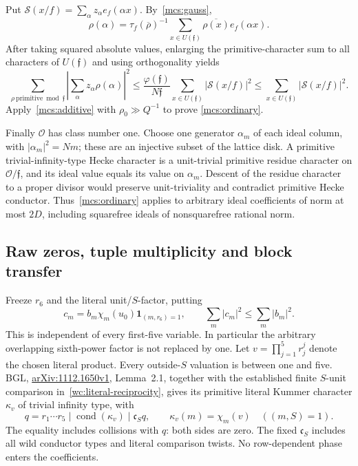 \documentclass[11pt,oneside,openany]{book}
\theoremstyle{definition}\newtheorem{definition}[theorem]{Definition}
\theoremstyle{remark}\newtheorem{remark}[theorem]{Remark}
\begin{document}
Put $\mathcal S(x/f)=\sum_\alpha z_\alpha e_f(\alpha x)$.
By~\eqref{mcs:gauss},
\[
 \rho(\alpha)=\tau_f(\overline\rho)^{-1}
       \sum_{x\in U(\mathfrak f)}\overline{\rho(x)}e_f(\alpha x).
\]
After taking squared absolute values, enlarging the primitive-character
sum to all characters of $U(\mathfrak f)$ and using orthogonality yields
\[
 \sum_{\rho\ \mathrm{primitive}\bmod\mathfrak f}
       \left|\sum_\alpha z_\alpha\rho(\alpha)\right|^2
 \le\frac{\varphi(\mathfrak f)}{N\mathfrak f}
       \sum_{x\in U(\mathfrak f)}|\mathcal S(x/f)|^2
 \le\sum_{x\in U(\mathfrak f)}|\mathcal S(x/f)|^2.
\]
Apply~\eqref{mcs:additive} with $\rho_0\gg Q^{-1}$ to prove
\eqref{mcs:ordinary}.

Finally $\mathcal O$ has class number one. Choose one generator
$\alpha_m$ of each ideal column, with $|\alpha_m|^2=Nm$; these are an
injective subset of the lattice disk. A primitive trivial-infinity-type
Hecke character is a unit-trivial primitive residue character on
$\mathcal O/\mathfrak f$, and its ideal value equals its value on
$\alpha_m$. Descent of the residue character to a proper divisor would
preserve unit-triviality and contradict primitive Hecke conductor.
Thus~\eqref{mcs:ordinary} applies to arbitrary ideal coefficients of
norm at most $2D$, including squarefree ideals of nonsquarefree rational norm.

\subsection{Raw zeros, tuple multiplicity and block transfer}
Freeze $r_6$ and the literal unit/$S$-factor, putting
\[
 c_m=b_m\chi_m(u_0)\mathbf1_{(m,r_6)=1},\qquad
       \sum_m|c_m|^2\le\sum_m|b_m|^2.
\]
This is independent of every first-five variable. In particular the
arbitrary overlapping sixth-power factor is not replaced by one.
Let $v=\prod_{j=1}^5r_j^j$ denote the chosen literal product.
Every outside-$S$ valuation is between one and five.
BGL, \href{https://arxiv.org/pdf/1112.1650v1}{arXiv:1112.1650v1},
Lemma~2.1, together with the established finite $S$-unit comparison
in~\eqref{wc:literal-reciprocity}, gives its primitive literal Kummer
character $\kappa_v$ of trivial infinity type, with
\[
 q=r_1\cdots r_5\mid\operatorname{cond}(\kappa_v)\mid\mathfrak c_Sq,
 \qquad \kappa_v(m)=\chi_m(v)\quad((m,S)=1).
\]
The equality includes collisions with $q$: both sides are zero.
The fixed $\mathfrak c_S$ includes all wild conductor types and literal
comparison twists. No row-dependent phase enters the coefficients.
\end{document}
